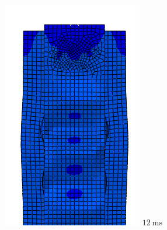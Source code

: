 \documentclass[
documentsize = a4, %
font = cmr, %
typesize = 11, %
printmode = true,
onehalfspacing = true,
language = en, %
titlepage = udciccp, %
degree = pt, %
dedication = true,
acknowledgements = true,
abstract-en = true,
abstract-es = false,
abstract-ga = false,
epigraphs = true,
toc = true,
lof = true,
lot = true,
frontmatterintoc = false,
notation = false,
minimal = false,
]{UDCthesis}
\begin{document}
\begin{figure}
\begin{minipage}[b]{.15\linewidth}
		\includegraphics[width=\linewidth]{IMG_CUTRES/c4}
		$\SI{12}{\ms}$
	\end{minipage}
	\quad
	\begin{minipage}[b]{.15\linewidth}
		\centering

\end{minipage}
\end{figure}
\end{document}

